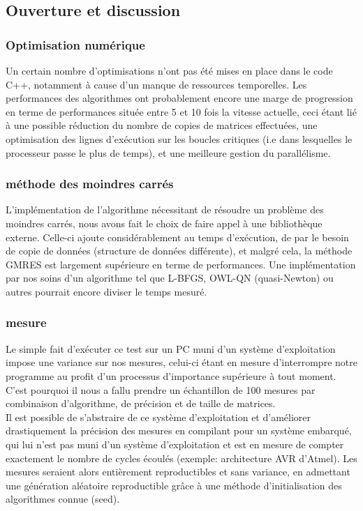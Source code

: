 


\subsection{Ouverture et discussion}
\subsubsection{Optimisation numérique}
Un certain nombre d'optimisations n'ont pas été mises en place dans le code C++, notamment à cause d'un manque de ressources temporelles. Les performances des algorithmes ont probablement encore une marge de progression en terme de performances située entre 5 et 10 fois la vitesse actuelle, ceci étant lié à une possible réduction du nombre de copies de matrices effectuées, une optimisation des lignes d'exécution sur les boucles critiques (i.e dans lesquelles le processeur passe le plus de temps), et une meilleure gestion du parallélisme.


\subsubsection{méthode des moindres carrés}
L'implémentation de l'algorithme nécessitant de résoudre un problème des moindres carrés, nous avons fait le choix de faire appel à une bibliothèque externe. Celle-ci ajoute considérablement au temps d'exécution, de par le besoin de copie de données (structure de données différente), et malgré cela, la méthode GMRES est largement supérieure en terme de performances. Une implémentation par nos soins d'un algorithme tel que L-BFGS, OWL-QN (quasi-Newton) ou autres pourrait encore diviser le temps mesuré.


\subsubsection{mesure}
Le simple fait d'exécuter ce test sur un PC muni d'un système d'exploitation impose une variance sur nos mesures, celui-ci étant en mesure d'interrompre notre programme au profit d'un processus d'importance supérieure à tout moment. C'est pourquoi il nous a fallu prendre un échantillon de 100 mesures par combinaison d'algorithme, de précision et de taille de matrices.\\

Il est possible de s'abstraire de ce système d'exploitation et d'améliorer drastiquement la précision des mesures en compilant pour un système embarqué, qui lui n'est pas muni d'un système d'exploitation et est en mesure de compter exactement le nombre de cycles écoulés (exemple: architecture AVR d'Atmel). Les mesures seraient alors entièrement reproductibles et sans variance, en admettant une génération aléatoire reproductible grâce à une méthode d'initialisation des algorithmes connue (seed). 


